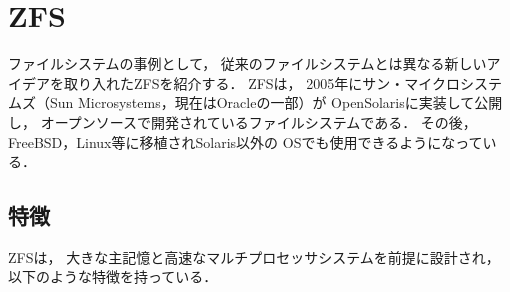 
\chapter{ZFS}
ファイルシステムの事例として，
従来のファイルシステムとは異なる新しいアイデアを取り入れたZFSを紹介する．
ZFSは，
2005年にサン・マイクロシステムズ（Sun Microsystems，現在はOracleの一部）が
OpenSolarisに実装して公開し，
オープンソースで開発されているファイルシステムである．
その後，FreeBSD，Linux等に移植されSolaris以外の
OSでも使用できるようになっている．

\section{特徴}
ZFSは，
大きな主記憶と高速なマルチプロセッサシステムを前提に設計され，
以下のような特徴を持っている．

